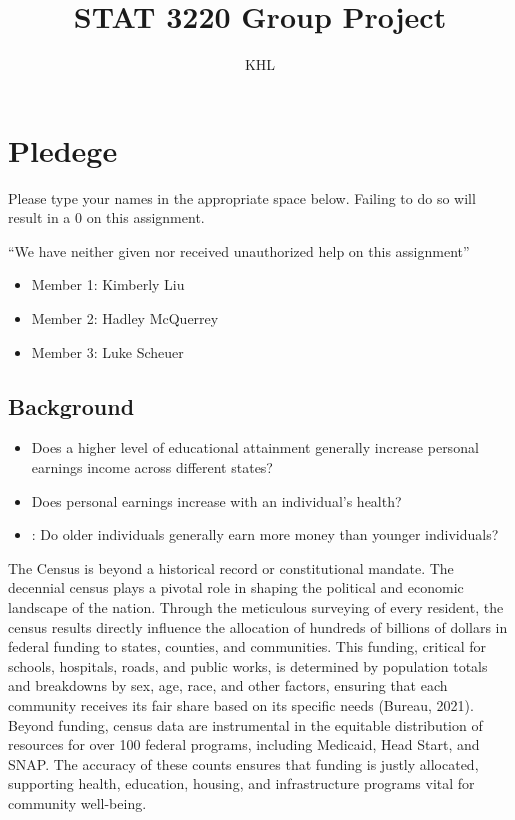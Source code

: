 \documentclass[
  12pt,
]{article}
\title{STAT 3220 Group Project}
\author{KHL}
\date{}
\providecommand{\tightlist}{%
  \setlength{\itemsep}{0pt}\setlength{\parskip}{0pt}}
\begin{document}
\maketitle

\newpage

\hypertarget{pledege}{%
\section{Pledege}\label{pledege}}

Please type your names in the appropriate space below. Failing to do so
will result in a 0 on this assignment.

``We have neither given nor received unauthorized help on this
assignment''

\begin{itemize}
\tightlist
\item
  Member 1: Kimberly Liu
\item
  Member 2: Hadley McQuerrey
\item
  Member 3: Luke Scheuer
\end{itemize}

\newpage

\hypertarget{background}{%
\subsection{Background}\label{background}}

\begin{itemize}
  \item Does a higher level of educational attainment generally increase personal earnings income across different states?
  \item Does personal earnings increase with an individual's health?
  \item: Do older individuals generally earn more money than younger individuals? 
\end{itemize}

The Census is beyond a historical record or constitutional mandate. The
decennial census plays a pivotal role in shaping the political and
economic landscape of the nation. Through the meticulous surveying of
every resident, the census results directly influence the allocation of
hundreds of billions of dollars in federal funding to states, counties,
and communities. This funding, critical for schools, hospitals, roads,
and public works, is determined by population totals and breakdowns by
sex, age, race, and other factors, ensuring that each community receives
its fair share based on its specific needs (Bureau, 2021). Beyond
funding, census data are instrumental in the equitable distribution of
resources for over 100 federal programs, including Medicaid, Head Start,
and SNAP. The accuracy of these counts ensures that funding is justly
allocated, supporting health, education, housing, and infrastructure
programs vital for community well-being.
\end{document}
